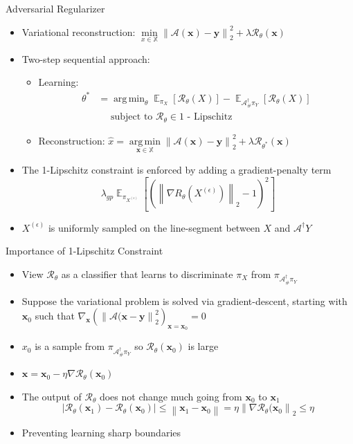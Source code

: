 \documentclass{beamer}
\newcommand{\norm}[1]{\left\lVert#1\right\rVert}
\DeclareMathOperator*{\argmin}{arg\,min}
\DeclareMathOperator{\EX}{\mathbb{E}}%
\begin{document}
\begin{frame}{Adversarial Regularizer}
\begin{itemize}
\item Variational reconstruction: $\min\limits_{x \in \mathbb{X}} \norm{\mathcal{A}(\pmb{x}) - \pmb{y}}_{2}^{2} + \lambda \mathcal{R}_{\theta}(\pmb{x})$
\item Two-step sequential approach:
\begin{itemize}
\item Learning:
\begin{align*}
\theta^{*} &= \argmin_{\theta} \EX_{\pi_{X}} \left[ \mathcal{R}_{\theta}(X) \right] - 
\EX_{\mathcal{A}_{\text{\#}}^{\dagger}\pi_{Y}} \left[ \mathcal{R}_{\theta}(X) \right] \\[.5em]
&\quad\text{ subject to } \mathcal{R}_{\theta} \in \text{1 - Lipschitz}
\end{align*}
\item Reconstruction: $\hat{x} = \argmin\limits_{\pmb{x} \in \mathbb{X}} \norm{\mathcal{A}(\pmb{x}) - \pmb{y}}_{2}^{2} + \lambda \mathcal{R}_{\theta^{*}}(\pmb{x})$
\end{itemize}
\item The 1-Lipschitz constraint is enforced by adding a gradient-penalty term
$$
\lambda_{gp} \EX_{\pi_{X^{(\epsilon)}}}\left[
\left( \norm{\nabla R_{\theta}\left( X^{(\epsilon)} \right) }_{2} - 1 \right)^{2}
\right]
$$
\item $X^{(\epsilon)}$ is uniformly sampled on the line-segment between $X$ and $\mathcal{A}^{\dagger}Y$
\end{itemize}
\end{frame}

\begin{frame}{Importance of 1-Lipschitz Constraint}
\begin{itemize}
\item View $\mathcal{R}_{\theta}$ as a classifier that learns to discriminate $\pi_{X}$ from $\pi_{\mathcal{\mathcal{A}_{\text{\#}}^{\dagger}} \pi_{Y}}$
\item Suppose the variational problem is solved via gradient-descent, starting with $\pmb{x}_{0}$ such that $\nabla_{\pmb{x}} \left( \norm{\mathcal{A}(\pmb{x} - \pmb{y}}_{2}^{2} \right)_{\pmb{x} = \pmb{x}_0} = 0$
\item $x_{0}$ is a sample from $\pi_{\mathcal{\mathcal{A}_{\text{\#}}^{\dagger}} \pi_{Y}}$ so $\mathcal{R}_{\theta}(\pmb{x}_{0})$ is large
\item $\pmb{x} = \pmb{x}_0 - \eta \nabla \mathcal{R}_{\theta}(\pmb{x}_0)$
\item The output of $\mathcal{R}_{\theta}$ does not change much going from $\pmb{x}_0$ to $\pmb{x}_1$
$$
|\mathcal{R}_{\theta}(\pmb{x}_1) - \mathcal{R}_{\theta}(\pmb{x}_0)|
\leq \norm{\pmb{x}_1 - \pmb{x}_0} = \eta \norm{\nabla \mathcal{R}_{\theta}(\pmb{x}_0}_{2} 
\leq \eta
$$
\item Preventing learning sharp boundaries
\end{itemize}
\end{frame}
\end{document}
